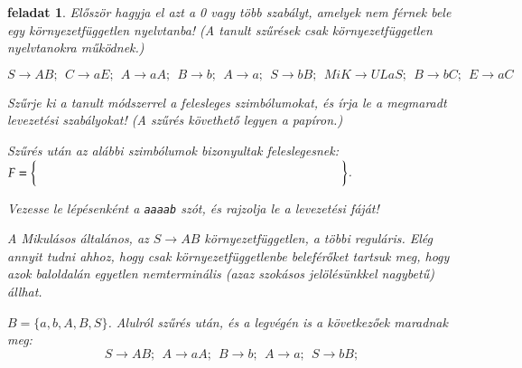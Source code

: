\documentclass[a4paper]{article}
\newtheorem{feladat}{feladat}[section]
\begin{document}
\begin{feladat}%
Először hagyja el azt a 0 vagy több szabályt, amelyek nem férnek bele
egy környezetfüggetlen nyelvtanba!
(A tanult szűrések csak környezetfüggetlen nyelvtanokra működnek.)

\[
S\rightarrow AB;\:\:
C\rightarrow aE;\:\:
A\rightarrow aA;\:\:
B\rightarrow b;\:\:
A\rightarrow a;\:\:
S\rightarrow bB;\:\:
MiK\rightarrow ULaS;\:\:
B\rightarrow bC;\:\:
E\rightarrow aC
\]

Szűrje ki a tanult módszerrel a felesleges szimbólumokat, és írja le a
megmaradt levezetési szabályokat! (A szűrés követhető legyen a papíron.)

Szűrés után az alábbi szimbólumok bizonyultak feleslegesnek:\\[1ex]
$F=\left\{\rule{0pt}{1.2em}\hspace{.7\linewidth}\right\}$.

Vezesse le lépésenként a \verb+aaaab+ szót, és rajzolja le a levezetési fáját!

\vspace{2em}
\begin{megoldas}
A Mikulásos általános, az $S\rightarrow AB$ környezetfüggetlen, a többi
reguláris. Elég annyit tudni ahhoz, hogy csak környezetfüggetlenbe
beleférőket tartsuk meg, hogy azok baloldalán egyetlen nemterminális
(azaz szokásos jelölésünkkel nagybetű) állhat.

$B=\{a,b,A,B,S\}$.
Alulról szűrés után, és a legvégén is a következőek maradnak meg:
\[
S\rightarrow AB;\:\:
A\rightarrow aA;\:\:
B\rightarrow b;\:\:
A\rightarrow a;\:\:
S\rightarrow bB;\:\:
\]


\end{megoldas}
\end{feladat}
\end{document}
